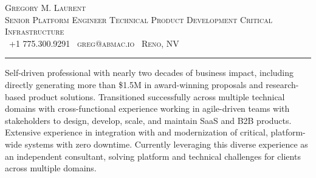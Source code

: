 \renewenvironment{quote}
  {\list{}{\rightmargin=0em\leftmargin=0em\topsep=0.5em\partopsep=0pt\parsep=0pt}%
   \item\relax\RaggedRight\sloppy}  %
  {\endlist}
 
\noindent\scshape
    {Gregory M. Laurent}\\[0.25em]
    {Senior Platform Engineer
    \raisebox{0.3\height}{\tiny\faCircle} Technical Product Development
  \raisebox{0.3\height}{\tiny\faCircle} Critical Infrastructure }\\[0.5em]
    \normalsize
    {\raisebox{-0.1\height}\faPhone\ +1 775.300.9291}
    \hfill
    {\raisebox{-0.1\height}\faEnvelope\ greg@abmac.io}
    \hfill
    {\raisebox{0\height}\faHome\ Reno, NV}\\
    \noindent\rule{\textwidth}{0.04em}
\normalfont
\begin{quote}
Self-driven professional with nearly two decades of business impact, including directly generating more than \$1.5M in award-winning proposals and research-based product solutions. Transitioned successfully across multiple technical domains with cross-functional experience working in agile-driven teams with stakeholders to design, develop, scale, and maintain SaaS and B2B products. Extensive experience in integration with and modernization of critical, platform-wide systems with zero downtime. Currently leveraging this diverse experience as an independent consultant, solving platform and technical challenges for clients across multiple domains.
\end{quote}
